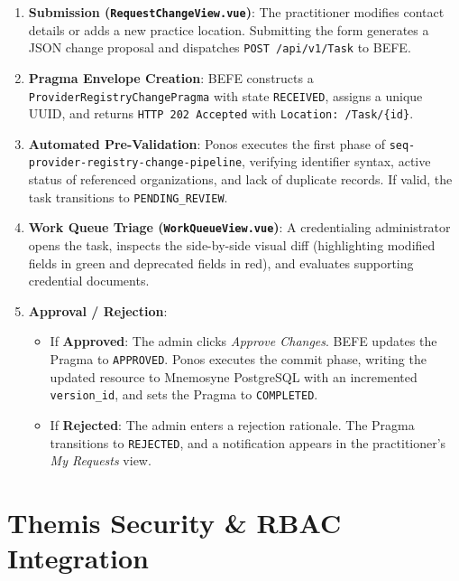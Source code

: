 \begin{enumerate}
    \item \textbf{Submission (\texttt{RequestChangeView.vue})}: The practitioner modifies contact details or adds a new practice location. Submitting the form generates a JSON change proposal and dispatches \texttt{POST /api/v1/Task} to BEFE.
    \item \textbf{Pragma Envelope Creation}: BEFE constructs a \texttt{ProviderRegistryChangePragma} with state \texttt{RECEIVED}, assigns a unique UUID, and returns \texttt{HTTP 202 Accepted} with \texttt{Location: /Task/\{id\}}.
    \item \textbf{Automated Pre-Validation}: Ponos executes the first phase of \texttt{seq-provider-registry-change-pipeline}, verifying identifier syntax, active status of referenced organizations, and lack of duplicate records. If valid, the task transitions to \texttt{PENDING\_REVIEW}.
    \item \textbf{Work Queue Triage (\texttt{WorkQueueView.vue})}: A credentialing administrator opens the task, inspects the side-by-side visual diff (highlighting modified fields in green and deprecated fields in red), and evaluates supporting credential documents.
    \item \textbf{Approval / Rejection}:
    \begin{itemize}
        \item If \textbf{Approved}: The admin clicks \textit{Approve Changes}. BEFE updates the Pragma to \texttt{APPROVED}. Ponos executes the commit phase, writing the updated resource to Mnemosyne PostgreSQL with an incremented \texttt{version\_id}, and sets the Pragma to \texttt{COMPLETED}.
        \item If \textbf{Rejected}: The admin enters a rejection rationale. The Pragma transitions to \texttt{REJECTED}, and a notification appears in the practitioner's \textit{My Requests} view.
    \end{itemize}
\end{enumerate}

\section{Themis Security \& RBAC Integration}
\label{sec:iris_themis_security}

